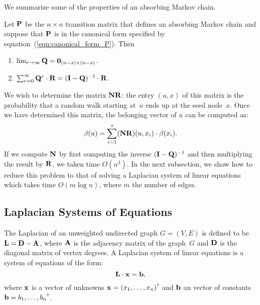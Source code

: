 We summarize some of the properties of an absorbing Markov chain. 
\begin{proposition}\label{prop:limiting_Q}
	Let $\mathbf{P}$ be the $n \times n$ transition matrix that defines an absorbing Markov chain
	and suppose that $\mathbf{P}$ is in the canonical form specified by equation~(\ref{eqn:canonical_form_P}). 
	Then
	\begin{enumerate}
		\item $\lim_{r \to \infty} \mathbf{Q} = \mathbf{0}_{(n - s) \times (n - s)}$.
		\item $\sum_{r = 0}^{\infty} \mathbf{Q}^r \cdot \mathbf{R} = (\mathbf{I} - \mathbf{Q})^{-1} \cdot \mathbf{R}$.
	\end{enumerate} 
\end{proposition}

We wish to determine the matrix $\mathbf{N} \mathbf{R}$: the entry $(u, x)$ of this 
matrix is the probability that a random walk starting at~$u$ ends up at the seed 
node~$x$. Once we have determined this matrix, the belonging vector of $u$ can 
be computed as:
\begin{equation}\label{eqn:belonging_vector}
	\beta(u) = \sum_{i = 1}^{s} (\mathbf{N} \mathbf{R}) (u, x_i) \cdot \beta(x_i).
\end{equation}
If we compute $\mathbf{N}$ by first computing the inverse $(\mathbf{I} - \mathbf{Q})^{-1}$
and then multiplying the result by $\mathbf{R}$, we taken time $O(n^3)$. In the 
next subsection, we show how to reduce this problem to that of solving a 
Laplacian system of linear equations which takes time $O(m \log n)$, where $m$
the number of edges. 

\subsection{Laplacian Systems of Equations}

The Laplacian of an unweighted undirected graph $G = (V, E)$ is defined to be 
$\mathbf{L} = \mathbf{D} - \mathbf{A}$, where $\mathbf{A}$ is the adjacency matrix of the graph~$G$ 
and $\mathbf{D}$ is the diagonal matrix of vertex degrees. 
A Laplacian system of linear equations is a system of equations of the form:
\[
	\mathbf{L} \cdot \mathbf{x} = \mathbf{b},
\]
where $\mathbf{x}$ is a vector of unknowns $\mathbf{x} = {(x_1, \ldots, x_n)}^{\scriptscriptstyle \mathsf{T}}$ 
and $\mathbf{b}$ an vector of constants $\mathbf{b} = {b_1, \ldots, b_n}^{\scriptscriptstyle \mathsf{T}}$.
